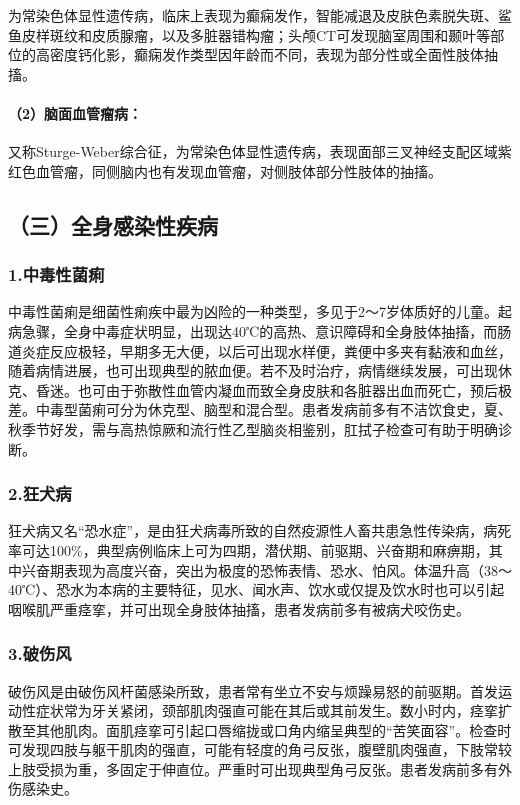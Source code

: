 为常染色体显性遗传病，临床上表现为癫痫发作，智能减退及皮肤色素脱失斑、鲨鱼皮样斑纹和皮质腺瘤，以及多脏器错构瘤；头颅CT可发现脑室周围和颞叶等部位的高密度钙化影，癫痫发作类型因年龄而不同，表现为部分性或全面性肢体抽搐。

\paragraph{（2）脑面血管瘤病：}

又称Sturge-Weber综合征，为常染色体显性遗传病，表现面部三叉神经支配区域紫红色血管瘤，同侧脑内也有发现血管瘤，对侧肢体部分性肢体的抽搐。

\subsection{（三）全身感染性疾病}

\subsubsection{1.中毒性菌痢}

中毒性菌痢是细菌性痢疾中最为凶险的一种类型，多见于2～7岁体质好的儿童。起病急骤，全身中毒症状明显，出现达40℃的高热、意识障碍和全身肢体抽搐，而肠道炎症反应极轻，早期多无大便，以后可出现水样便，粪便中多夹有黏液和血丝，随着病情进展，也可出现典型的脓血便。若不及时治疗，病情继续发展，可出现休克、昏迷。也可由于弥散性血管内凝血而致全身皮肤和各脏器出血而死亡，预后极差。中毒型菌痢可分为休克型、脑型和混合型。患者发病前多有不洁饮食史，夏、秋季节好发，需与高热惊厥和流行性乙型脑炎相鉴别，肛拭子检查可有助于明确诊断。

\subsubsection{2.狂犬病}

狂犬病又名“恐水症”，是由狂犬病毒所致的自然疫源性人畜共患急性传染病，病死率可达100\%，典型病例临床上可为四期，潜伏期、前驱期、兴奋期和麻痹期，其中兴奋期表现为高度兴奋，突出为极度的恐怖表情、恐水、怕风。体温升高（38～40℃）、恐水为本病的主要特征，见水、闻水声、饮水或仅提及饮水时也可以引起咽喉肌严重痉挛，并可出现全身肢体抽搐，患者发病前多有被病犬咬伤史。

\subsubsection{3.破伤风}

破伤风是由破伤风杆菌感染所致，患者常有坐立不安与烦躁易怒的前驱期。首发运动性症状常为牙关紧闭，颈部肌肉强直可能在其后或其前发生。数小时内，痉挛扩散至其他肌肉。面肌痉挛可引起口唇缩拢或口角内缩呈典型的“苦笑面容”。检查时可发现四肢与躯干肌肉的强直，可能有轻度的角弓反张，腹壁肌肉强直，下肢常较上肢受损为重，多固定于伸直位。严重时可出现典型角弓反张。患者发病前多有外伤感染史。

